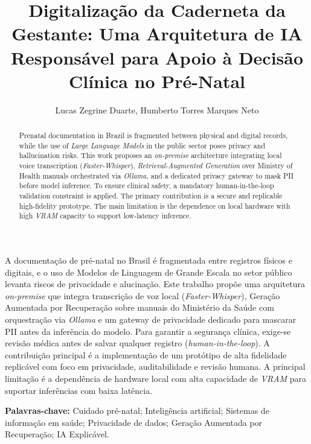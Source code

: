 \documentclass[12pt]{article}
\title{Digitalização da Caderneta da Gestante: Uma Arquitetura de IA Responsável para Apoio à Decisão Clínica no Pré-Natal}
\author{Lucas Zegrine Duarte\inst{1}, Humberto Torres Marques Neto\inst{1}}
\begin{document}
\maketitle

\begin{abstract}
  Prenatal documentation in Brazil is fragmented between physical and digital records, while the use of \textit{Large Language Models} in the public sector poses privacy and hallucination risks.
  This work proposes an \textit{on-premise} architecture integrating local voice transcription (\textit{Faster-Whisper}), \textit{Retrieval-Augmented Generation} over Ministry of Health manuals orchestrated via \textit{Ollama}, and a dedicated privacy gateway to mask PII before model inference.
  To ensure clinical safety, a mandatory human-in-the-loop validation constraint is applied. The primary contribution is a secure and replicable high-fidelity prototype.
  The main limitation is the dependence on local hardware with high \textit{VRAM} capacity to support low-latency inference.
\end{abstract}

\begin{resumo}
  A documentação de pré-natal no Brasil é fragmentada entre registros físicos e digitais, e o uso de Modelos de Linguagem de Grande Escala no setor público levanta riscos de privacidade e alucinação.
  Este trabalho propõe uma arquitetura \textit{on-premise} que integra transcrição de voz local (\textit{Faster-Whisper}), Geração Aumentada por Recuperação sobre manuais do Ministério da Saúde com orquestração via \textit{Ollama} e um gateway de privacidade dedicado para mascarar PII antes da inferência do modelo.
  Para garantir a segurança clínica, exige-se revisão médica antes de salvar qualquer registro (\textit{human-in-the-loop}). A contribuição principal é a implementação de um protótipo de alta fidelidade replicável com foco em privacidade, auditabilidade e revisão humana.
  A principal limitação é a dependência de hardware local com alta capacidade de \textit{VRAM} para suportar inferências com baixa latência.
\end{resumo}

\noindent \textbf{Palavras-chave:} Cuidado pré-natal; Inteligência artificial; Sistemas de informação em saúde; Privacidade de dados; Geração Aumentada por Recuperação; IA Explicável.

\end{document}
